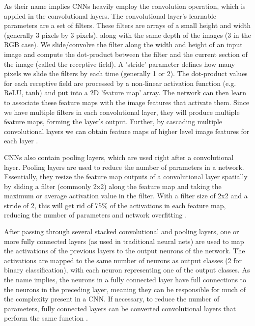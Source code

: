 \documentclass[10pt,twocolumn,letterpaper]{article}
\begin{document}
As their name implies CNNs heavily employ the convolution operation, which is applied in the convolutional layers. The convolutional layer's learnable parameters are a set of filters. These filters are arrays of a small height and width (generally 3 pixels by 3 pixels), along with the same depth of the images (3 in the RGB case). We slide/convolve the filter along the width and height of an input image and compute the dot-product between the filter and the current section of the image (called the receptive field). A 'stride' parameter defines how many pixels we slide the filters by each time (generally 1 or 2). The dot-product values for each receptive field are processed by a non-linear activation function (e.g. ReLU, tanh) and put into a 2D 'feature map' array. The network can then learn to associate these feature maps with the image features that activate them. Since we have multiple filters in each convolutional layer, they will produce multiple feature maps, forming the layer's output. Further, by cascading multiple convolutional layers we can obtain feature maps of higher level image features for each layer \cite{karpathy_2018_cnn}\cite[Ch.6]{nielsen2015neural}\cite[Ch.9]{goodfellow2016deep}\cite{andreopoulos2018CNN}.

CNNs also contain pooling layers, which are used right after a convolutional layer. Pooling layers are used to reduce the number of parameters in a network. Essentially, they resize the feature map outputs of a convolutional layer spatially by sliding a filter (commonly 2x2) along the feature map and taking the maximum or average activation value in the filter. With a filter size of 2x2 and a stride of 2, this will get rid of 75\% of the activations in each feature map, reducing the number of parameters and network overfitting \cite{karpathy_2018_cnn}\cite[Ch.6]{nielsen2015neural}\cite[Ch.9]{goodfellow2016deep}\cite{andreopoulos2018CNN}.

After passing through several stacked convolutional and pooling layers, one or more fully connected layers (as used in traditional neural nets) are used to map the activations of the previous layers to the output neurons of the network. The activations are mapped to the same number of neurons as output classes (2 for binary classification), with each neuron representing one of the output classes. As the name implies, the neurons in a fully connected layer have full connections to the neurons in the preceding layer, meaning they can be responsible for much of the complexity present in a CNN. If necessary, to reduce the number of parameters, fully connected layers can be converted convolutional layers that perform the same function \cite{karpathy_2018_cnn}\cite[Ch.6]{nielsen2015neural}\cite[Ch.9]{goodfellow2016deep}\cite{andreopoulos2018CNN}.
\end{document}

